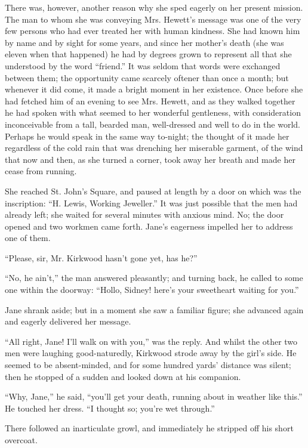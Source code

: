 There was, however, another reason why she sped eagerly on her present
mission. The man to whom she was conveying Mrs. Hewett's message was one
of the very few persons who had ever treated her with human kindness.
She had known him by name and by sight for some years, and since her
mother's death (she was eleven when that happened) he had by degrees
grown to represent all that she understood by the word ``friend.'' It
was seldom that words were exchanged between them; the opportunity came
scarcely oftener than once a month; but whenever it did come, it made a
bright moment in her existence. Once before she had fetched him of an
evening to see Mrs. Hewett, and as they walked together he had spoken
with what seemed to her wonderful gentleness, with consideration
{\protect\hypertarget{29}{}{}}inconceivable from a tall, bearded man,
well-dressed and well to do in the world. Perhaps he would speak in the
same way to-night; the thought of it made her regardless of the cold
rain that was drenching her miserable garment, of the wind that now and
then, as she turned a corner, took away her breath and made her cease
from running.

She reached St. John's Square, and paused at length by a door on which
was the inscription: ``H. Lewis, Working Jeweller.'' It was just
possible that the men had already left; she waited for several minutes
with anxious mind. No; the door opened and two workmen came forth.
Jane's eagerness impelled her to address one of them.

``Please, sir, Mr. Kirkwood hasn't gone yet, has he?''

``No, he ain't,'' the man answered pleasantly; and turning back, he
called to some one within the doorway: ``Hollo, Sidney! here's your
sweetheart waiting for you.''

Jane shrank aside; but in a moment she {\protect\hypertarget{30}{}{}}saw
a familiar figure; she advanced again and eagerly delivered her message.

``All right, Jane! I'll walk on with you,'' was the reply. And whilst
the other two men were laughing good-naturedly, Kirkwood strode away by
the girl's side. He seemed to be absent-minded, and for some hundred
yards' distance was silent; then he stopped of a sudden and looked down
at his companion.

``Why, Jane,'' he said, ``you'll get your death, running about in
weather like this.'' He touched her dress. ``I thought so; you're wet
through.''

There followed an inarticulate growl, and immediately he stripped off
his short overcoat.

